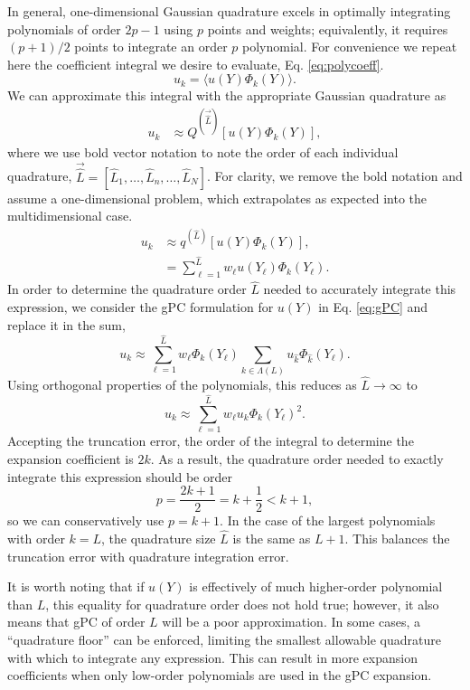 In general, one-dimensional Gaussian
quadrature excels in optimally integrating polynomials of order $2p-1$ using $p$ points and weights;
equivalently, it requires $(p+1)/2$ points to integrate an order $p$ polynomial. 
For convenience we repeat here the coefficient integral we desire to evaluate, Eq.
\ref{eq:polycoeff}.
\begin{equation}
  u_k = \langle u(Y)\Phi_k(Y) \rangle.
\end{equation}
We can approximate this integral with the appropriate Gaussian quadrature as
\begin{align}
  u_k &\approx Q^{(\vec{\hat L})}[u(Y)\Phi_k(Y)],
\end{align}
where we use bold vector notation to note the order of each individual quadrature,
$\vec{\hat L} = [\hat L_1, \ldots,\hat L_n,\ldots,\hat L_N]$. For clarity, we remove the bold notation and
assume a one-dimensional problem, which extrapolates as expected into the multidimensional case.
\begin{align}
  u_k &\approx q^{(\hat L)}[u(Y)\Phi_k(Y)],\\
      &= \sum_{\ell=1}^{\hat L} w_\ell u(Y_\ell)\Phi_k(Y_\ell).
\end{align}
In order to determine the quadrature order $\hat L$ needed to accurately integrate this expression, we consider the
gPC formulation for $u(Y)$ in Eq. \ref{eq:gPC} and replace it in the sum,
\begin{equation}
  u_k\approx \sum_{\ell=1}^{\hat L} w_\ell \Phi_k(Y_\ell) \sum_{k\in\Lambda(L)}u_{\hat k}\Phi_{\hat k}(Y_\ell).
\end{equation}
Using orthogonal properties of the polynomials, this reduces as $\hat L\to\infty$ to
\begin{equation}
  u_k\approx \sum_{\ell=1}^{\hat L} w_\ell u_k \Phi_k(Y_\ell)^2.
\end{equation}
Accepting the truncation error, the order of the integral to determine the expansion coefficient is
$2k$. As a result, the quadrature order needed to exactly integrate this expression should be order 
\begin{equation}
  p=\frac{2k+1}{2}=k+\frac{1}{2}<k+1,
\end{equation}
so we can conservatively use $p=k+1$.  In the case of the largest polynomials with order
$k=L$, the quadrature size $\hat L$ is the same as $L+1$.  This balances the truncation error with quadrature
integration error.

It is worth noting that if $u(Y)$ is effectively of
much higher-order polynomial than $L$, this equality for quadrature order does not hold true; however, it also
means that gPC of order $L$ will be a poor approximation.  In some cases, a ``quadrature floor'' can be
enforced, limiting the smallest allowable quadrature with which to integrate any expression.  This can result
in more expansion coefficients when only low-order polynomials are used in the gPC expansion.

